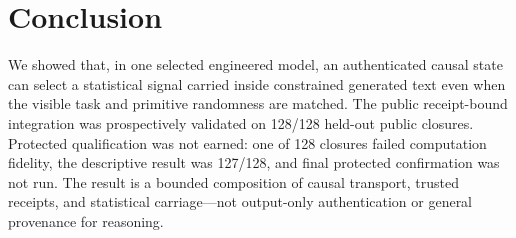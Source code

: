 \section{Conclusion}

We showed that, in one selected engineered model, an authenticated causal state
can select a statistical signal carried inside constrained generated text even
when the visible task and primitive randomness are matched. The public
receipt-bound integration was prospectively validated on 128/128 held-out
public closures. Protected qualification was not earned: one of 128 closures
failed computation fidelity, the descriptive result was 127/128, and final
protected confirmation was not run. The result is a bounded composition of
causal transport, trusted receipts, and statistical carriage---not output-only
authentication or general provenance for reasoning.
